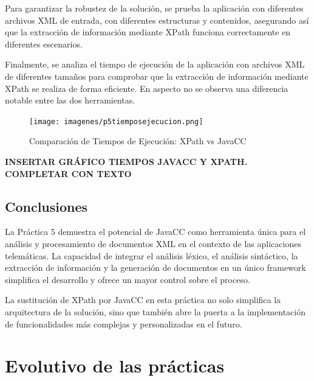 Para garantizar la robustez de la solución, se prueba la aplicación con diferentes archivos XML de entrada, con diferentes estructuras y contenidos, asegurando así que la extracción de información mediante XPath funciona correctamente en diferentes escenarios.

Finalmente, se analiza el tiempo de ejecución de la aplicación con archivos XML de diferentes tamaños para comprobar que la extracción de información mediante XPath se realiza de forma eficiente. En aspecto no se observa una diferencia notable entre las dos herramientas.

\begin{figure}[H]
	\centering
	\texttt{[image: imagenes/p5tiemposejecucion.png]}
	\caption{\label{fig:p5tiemposejecucion}Comparación de Tiempos de Ejecución: XPath vs JavaCC}
\end{figure}

\textbf{INSERTAR GRÁFICO TIEMPOS JAVACC Y XPATH. COMPLETAR CON TEXTO
}

\subsection{Conclusiones}

\noindent La Práctica 5 demuestra el potencial de JavaCC como herramienta única para el análisis y procesamiento de documentos XML en el contexto de las aplicaciones telemáticas. La capacidad de integrar el análisis léxico, el análisis sintáctico, la extracción de información y la generación de documentos en un único framework simplifica el desarrollo y ofrece un mayor control sobre el proceso. 



La sustitución de XPath por JavaCC en esta práctica no solo simplifica la arquitectura de la solución, sino que también abre la puerta a la implementación de funcionalidades más complejas y personalizadas en el futuro.

\section{Evolutivo de las prácticas}

